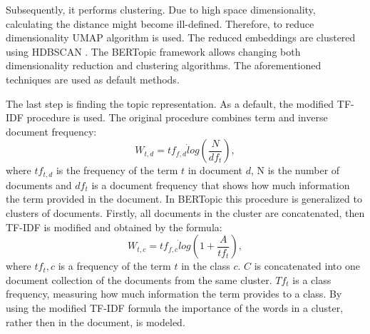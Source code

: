 \documentclass[11pt]{article}
\begin{document}
Subsequently, it performs clustering. Due to high space dimensionality, calculating the distance might become ill-defined. Therefore, to reduce dimensionality UMAP \cite{https://doi.org/10.48550/arxiv.1802.03426} algorithm is used. The reduced embeddings are clustered using HDBSCAN \cite{McInnes2017}. The BERTopic framework allows changing both dimensionality reduction and clustering algorithms. The aforementioned techniques are used as default methods.

The last step is finding the topic representation. As a default, the modified TF-IDF procedure is used. The original procedure combines term and inverse document frequency: \begin{equation}
  W_{t,d} = tf_{f,d}\dot log(\frac{N}{df_t}) ,
\end{equation}
where $tf_{t,d}$ is the frequency of the term $t$ in document $d$, N is the number of documents and $df_t$ is a document frequency that shows how much information the term provided in the document. In BERTopic this procedure is generalized to clusters of documents. Firstly, all documents in the cluster are concatenated, then TF-IDF is modified and obtained by the formula:
\begin{equation}
W_{t,c} = tf_{f,c}\dot log(1+\frac{A}{tf_t}),
\end{equation}
where $tf_t,c$ is a frequency of the term $t$ in the class $c$. $C$ is concatenated into one document collection of the documents from the same cluster. $Tf_t$ is a class frequency, measuring how much information the term provides to a class. By using the modified TF-IDF formula the importance of the words in a cluster, rather then in the document, is modeled. 
\end{document}
